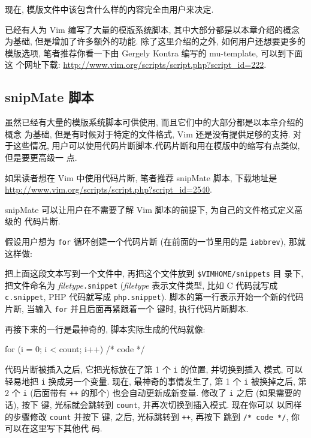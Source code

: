 现在, 模版文件中该包含什么样的内容完全由用户来决定.

\begin{warning}
    已经有人为 Vim 编写了大量的模版系统脚本, 其中大部分都是以本章介绍的概念为基础,
    但是增加了许多额外的功能. 除了这里介绍的之外, 如何用户还想要更多的模版选项,
    笔者推荐你看一下由 Gergely Kontra 编写的 mu-template, 可以到下面这
    个网址下载: \url{http://www.vim.org/scripts/script.php?script_id=222}.
\end{warning}

\subsection{snipMate 脚本}
\label{subsec:snippets_with_the_snipmate_script}

虽然已经有大量的模版系统脚本可供使用, 而且它们中的大部分都是以本章介绍的概念
为基础, 但是有时候对于特定的文件格式, Vim 还是没有提供足够的支持. 对于这些情况,
用户可以使用代码片断脚本.代码片断和用在模版中的缩写有点类似, 但是要更高级一
点.

如果读者想在 Vim 中使用代码片断, 笔者推荐 snipMate 脚本, 下载地址是
\url{http://www.vim.org/scripts/script.php?script_id=2540}.

snipMate 可以让用户在不需要了解 Vim 脚本的前提下, 为自己的文件格式定义高级的
代码片断.

假设用户想为 \texttt{for} 循环创建一个代码片断 (在前面的一节里用的是
\texttt{iabbrev}),  那就这样做:
把上面这段文本写到一个文件中, 再把这个文件放到 \texttt{\$VIMHOME/snippets} 目
录下, 把文件命名为 \textit{filetype}\texttt{.snippet} (\textit{filetype}
表示文件类型,
比如 C 代码就写成 \texttt{c.snippet}, PHP 代码就写成 \texttt{php.snippet}).
脚本的第一行表示开始一个新的代码片断, 当输入 \texttt{for} 并且后面再紧跟着一个
 键时, 执行代码片断脚本.

再接下来的一行是最神奇的, 脚本实际生成的代码就像:
\begin{vimcode}
    for (i = 0; i < count; i++) {
        /* code */
    }
\end{vimcode}

代码片断被插入之后, 它把光标放在了第 1 个 \texttt{i} 的位置, 并切换到插入
模式, 可以轻易地把 \texttt{i} 换成另一个变量. 现在, 最神奇的事情发生了,
第 1 个 \texttt{i} 被换掉之后, 第 2 个 \texttt{i} (后面带有 \texttt{++}
的那个) 也会自动更新成新变量. 修改了 \texttt{i} 之后 (如果需要的话), 按下
 键, 光标就会跳转到 \texttt{count}, 并再次切换到插入模式. 现在你可以
以同样的步骤修改 \texttt{count} 并按下  键, 之后, 光标跳转到
\texttt{++}, 再按下  跳到 \texttt{/* code */}, 你可以在这里写下其他代
码.

